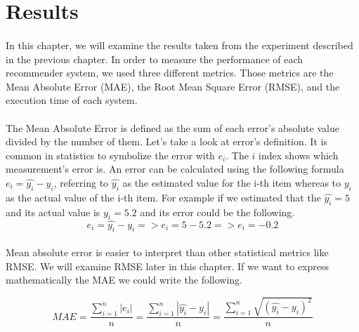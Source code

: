 \section{Results}

\paragraph{} In this chapter, we will examine the results taken from the experiment described in the previous chapter. 
In order to measure the performance of each recommender system, we used three different metrics. Those metrics are the Mean Absolute Error (MAE), the Root Mean Square Error (RMSE), and the execution time of each system.

\paragraph{} The Mean Absolute Error is defined as the sum of each error's absolute value divided by the number of them. Let's take a look
at error's definition. It is common in statistics to symbolize the error with $e_i$. The $i$ index shows which measurement's error is. An error can be calculated using the following formula $e_i = \widehat{y_i} - y_i$, referring to $\widehat{y_{i}}$ as the estimated value for the i-th item whereas to $y_i$ as the actual value of the i-th item. For example if we estimated that the $\widehat{y_i} = 5$ and its actual value is $y_i = 5.2$ and its error could be the following.
\begin{equation}
e_i = \widehat{y_i} - y_i => e_i = 5 - 5.2  => e_i = -0.2
\end{equation}

\paragraph{} Mean absolute error is easier to interpret than other statistical metrics like RMSE. We will examine RMSE later in this chapter. If we want to express mathematically the MAE we could write the following.

\begin{equation}
MAE = \frac{\sum_{i=1}^{n}{|e_i|}}{n} =
\frac{\sum_{i=1}^{n}{|\widehat{y_{i}}-y_{i}|} }{n} =
\frac{\sum_{i=1}^{n}\sqrt{{(\widehat{y_{i}}-y_{i})}^{2}}}{n}
\end{equation}

